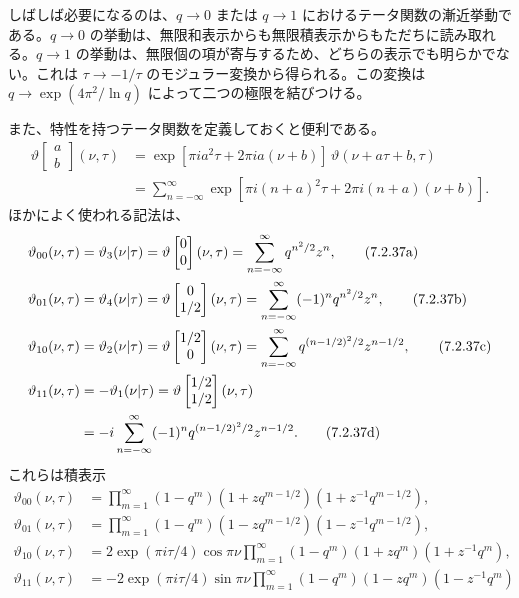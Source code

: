 しばしば必要になるのは、$q\to0$ または $q\to1$ におけるテータ関数の漸近挙動である。$q\to0$ の挙動は、無限和表示からも無限積表示からもただちに読み取れる。$q\to1$ の挙動は、無限個の項が寄与するため、どちらの表示でも明らかでない。これは $\tau\to-1/\tau$ のモジュラー変換から得られる。この変換は $q\to\exp(4\pi^2/\ln q)$ によって二つの極限を結びつける。

また、特性を持つテータ関数を定義しておくと便利である。
\begin{equation}
\begin{aligned}
\vartheta\begin{bmatrix}a\\b\end{bmatrix}(\nu,\tau)
&=\exp[\pi ia^2\tau+2\pi ia(\nu+b)]\,\vartheta(\nu+a\tau+b,\tau)\\
&=\sum_{n=-\infty}^{\infty}
\exp[\pi i(n+a)^2\tau+2\pi i(n+a)(\nu+b)].
\end{aligned}
\tag{7.2.36}\label{eq:7.2.36}
\end{equation}
ほかによく使われる記法は、
\begin{align}
\vartheta_{00}(\nu,\tau)
&=\vartheta_3(\nu|\tau)
=\vartheta\begin{bmatrix}0\\0\end{bmatrix}(\nu,\tau)
=\sum_{n=-\infty}^{\infty}q^{n^2/2}z^n,
\tag{7.2.37a}\label{eq:7.2.37a}\\
\vartheta_{01}(\nu,\tau)
&=\vartheta_4(\nu|\tau)
=\vartheta\begin{bmatrix}0\\1/2\end{bmatrix}(\nu,\tau)
=\sum_{n=-\infty}^{\infty}(-1)^nq^{n^2/2}z^n,
\tag{7.2.37b}\label{eq:7.2.37b}\\
\vartheta_{10}(\nu,\tau)
&=\vartheta_2(\nu|\tau)
=\vartheta\begin{bmatrix}1/2\\0\end{bmatrix}(\nu,\tau)
=\sum_{n=-\infty}^{\infty}q^{(n-1/2)^2/2}z^{n-1/2},
\tag{7.2.37c}\label{eq:7.2.37c}\\
\vartheta_{11}(\nu,\tau)
&=-\vartheta_1(\nu|\tau)
=\vartheta\begin{bmatrix}1/2\\1/2\end{bmatrix}(\nu,\tau)\notag\\
&=-i\sum_{n=-\infty}^{\infty}(-1)^nq^{(n-1/2)^2/2}z^{n-1/2}.
\tag{7.2.37d}\label{eq:7.2.37d}
\end{align}
これらは積表示
\begin{align}
\vartheta_{00}(\nu,\tau)
&=\prod_{m=1}^{\infty}(1-q^m)(1+zq^{m-1/2})(1+z^{-1}q^{m-1/2}),
\tag{7.2.38a}\label{eq:7.2.38a}\\
\vartheta_{01}(\nu,\tau)
&=\prod_{m=1}^{\infty}(1-q^m)(1-zq^{m-1/2})(1-z^{-1}q^{m-1/2}),
\tag{7.2.38b}\label{eq:7.2.38b}\\
\vartheta_{10}(\nu,\tau)
&=2\exp(\pi i\tau/4)\cos\pi\nu
\prod_{m=1}^{\infty}(1-q^m)(1+zq^m)(1+z^{-1}q^m),
\tag{7.2.38c}\label{eq:7.2.38c}\\
\vartheta_{11}(\nu,\tau)
&=-2\exp(\pi i\tau/4)\sin\pi\nu
\prod_{m=1}^{\infty}(1-q^m)(1-zq^m)(1-z^{-1}q^m)
\tag{7.2.38d}\label{eq:7.2.38d}
\end{align}
